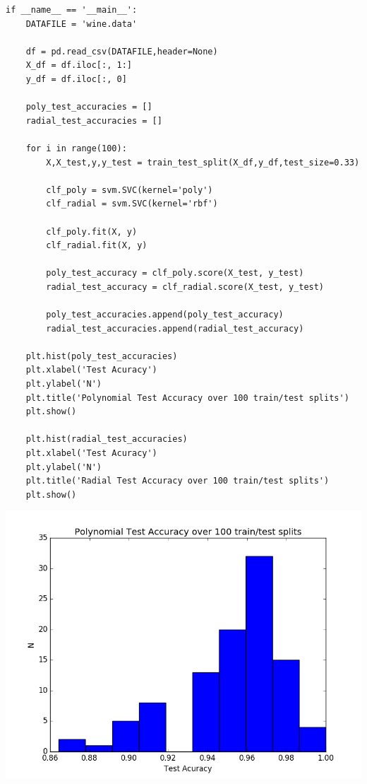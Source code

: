 \documentclass[12pt]{article}
\begin{document}
\begin{flushleft}
\begin{lstlisting}
if __name__ == '__main__':
	DATAFILE = 'wine.data'
	
	df = pd.read_csv(DATAFILE,header=None)
	X_df = df.iloc[:, 1:]
	y_df = df.iloc[:, 0]
	
	poly_test_accuracies = []
	radial_test_accuracies = []
	
	for i in range(100):
		X,X_test,y,y_test = train_test_split(X_df,y_df,test_size=0.33)
		
		clf_poly = svm.SVC(kernel='poly')
		clf_radial = svm.SVC(kernel='rbf')
		
		clf_poly.fit(X, y)
		clf_radial.fit(X, y)
		
		poly_test_accuracy = clf_poly.score(X_test, y_test)
		radial_test_accuracy = clf_radial.score(X_test, y_test)
		
		poly_test_accuracies.append(poly_test_accuracy)
		radial_test_accuracies.append(radial_test_accuracy)

	plt.hist(poly_test_accuracies)
	plt.xlabel('Test Acuracy')
	plt.ylabel('N')
	plt.title('Polynomial Test Accuracy over 100 train/test splits')
	plt.show()
	
	plt.hist(radial_test_accuracies)
	plt.xlabel('Test Acuracy')
	plt.ylabel('N')
	plt.title('Radial Test Accuracy over 100 train/test splits')
	plt.show()

			\end{lstlisting}
			
			\includegraphics[scale=0.5]{HW3_1C_0.png}
			\label{fig:graph 1C.1}
			

\end{flushleft}
\end{document}
